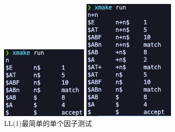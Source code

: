 \begin{figure}[htbp]
    \centering
    \begin{minipage}[t]{0.3\textwidth}
        \centering
        \includegraphics[width=\textwidth]{images/ll_1.png}
        \caption{LL(1)最简单的单个因子测试}
        \label{fig:ll-1}
    \end{minipage}
    \begin{minipage}[t]{0.3\textwidth}
        \centering
        \includegraphics[width=\textwidth]{images/ll_2.png}

\end{minipage}
\end{figure}
